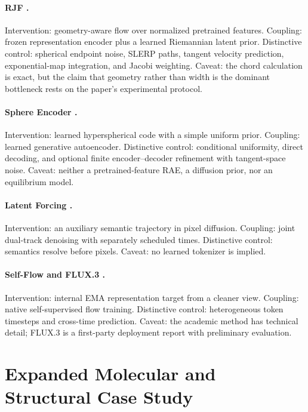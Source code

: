\documentclass{article}
\begin{document}
\paragraph{RJF \citep{kumar2026rjf}.}
Intervention: geometry-aware flow over normalized pretrained features. Coupling: frozen representation encoder plus a learned Riemannian latent prior. Distinctive control: spherical endpoint noise, SLERP paths, tangent velocity prediction, exponential-map integration, and Jacobi weighting. Caveat: the chord calculation is exact, but the claim that geometry rather than width is the dominant bottleneck rests on the paper's experimental protocol.

\paragraph{Sphere Encoder \citep{yue2026sphere}.}
Intervention: learned hyperspherical code with a simple uniform prior. Coupling: learned generative autoencoder. Distinctive control: conditional uniformity, direct decoding, and optional finite encoder--decoder refinement with tangent-space noise. Caveat: neither a pretrained-feature RAE, a diffusion prior, nor an equilibrium model.

\paragraph{Latent Forcing \citep{baade2026latentforcing}.}
Intervention: an auxiliary semantic trajectory in pixel diffusion. Coupling: joint dual-track denoising with separately scheduled times. Distinctive control: semantics resolve before pixels. Caveat: no learned tokenizer is implied.

\paragraph{Self-Flow and FLUX.3 \citep{chefer2026selfflow,bfl2026flux3}.}
Intervention: internal EMA representation target from a cleaner view. Coupling: native self-supervised flow training. Distinctive control: heterogeneous token timesteps and cross-time prediction. Caveat: the academic method has technical detail; FLUX.3 is a first-party deployment report with preliminary evaluation.

\section{Expanded Molecular and Structural Case Study}
\label{app:molecules}
\end{document}
